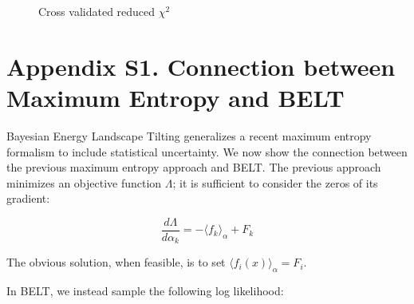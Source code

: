 \documentclass[journal=jacsat,manuscript=article]{achemso}
\begin{document}
\begin{figure}

\caption{
Cross validated reduced $\chi^2$
}
\label{figure:cross_val}
\end{figure}


\clearpage

\section{Appendix S1.  Connection between Maximum Entropy and BELT}


Bayesian Energy Landscape Tilting generalizes a recent maximum entropy formalism \cite{chodera2012} to include statistical uncertainty.  We now show the connection between the previous maximum entropy approach \cite{chodera2012} and BELT.  The previous approach minimizes an objective function $\Lambda$; it is sufficient to consider the zeros of its gradient:

$$\frac{d\Lambda}{d\alpha_k} = -\langle f_k \rangle_\alpha + F_k$$

The obvious solution, when feasible, is to set $\langle f_i(x) \rangle_\alpha = F_i$.  

In BELT, we instead sample the following log likelihood:
\end{document}
